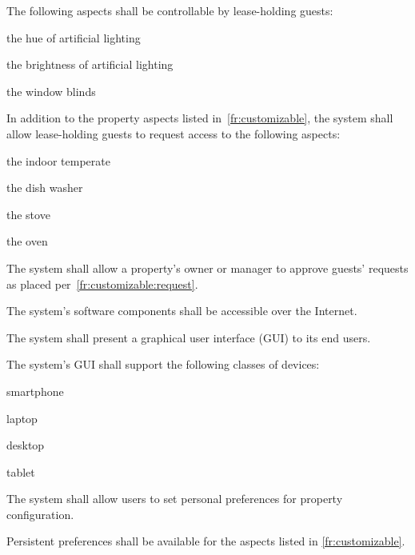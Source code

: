 \documentclass[letter,titlepage,oneside,english]{report}
\begin{document}
\begin{fr}
\begin{fr}
    The following aspects shall be controllable by lease-holding guests:
    \begin{fr}
    \item
      the hue of artificial lighting
    \item
      the brightness of artificial lighting
    \item
      the window blinds
    \end{fr}
  \item\label{fr:customizable:request}
    In addition to the property aspects listed in~\ref{fr:customizable}, the system shall allow lease-holding guests to request access to the following aspects:
    \begin{fr}
    \item
      the indoor temperate
    \item
      the dish washer
    \item
      the stove
    \item
      the oven
    \end{fr}
  \item\label{fr:customizable:request_approve}
    The system shall allow a property's owner or manager to approve guests' requests as placed per~\ref{fr:customizable:request}.
  \end{fr}
\item\label{fr:software}
  The system's software components shall be accessible over the Internet.
  \begin{fr}
  \item\label{fr:software:ui}
    The system shall present a graphical user interface (GUI) to its end users.
  \item\label{fr:software:devices}
    The system's GUI shall support the following classes of devices:
    \begin{fr}
    \item
      smartphone
    \item
      laptop
    \item
      desktop
    \item
      tablet
    \end{fr}
  \end{fr}
\item
  The system shall allow users to set personal preferences for property configuration.
  \begin{fr}
  \item
    Persistent preferences shall be available for the aspects listed in \ref{fr:customizable}.
  \item

\end{fr}
\end{fr}
\end{document}
